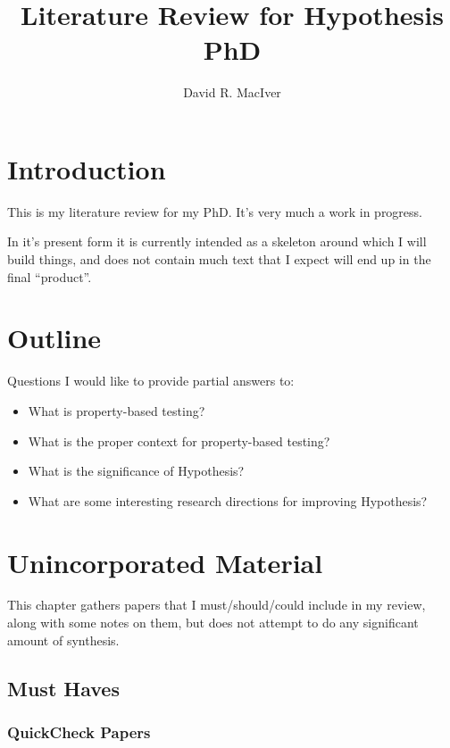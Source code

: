 

\title{Literature Review for Hypothesis PhD}
\author{David R. MacIver}



\maketitle

\tableofcontents

\chapter{Introduction}

This is my literature review for my PhD.
It's very much a work in progress.

In it's present form it is currently intended as a skeleton around which I will build things,
and does not contain much text that I expect will end up in the final ``product''.

\chapter{Outline}

Questions I would like to provide partial answers to:

\begin{itemize}
\item What is property-based testing?
\item What is the proper context for property-based testing?
\item What is the significance of Hypothesis?
\item What are some interesting research directions for improving Hypothesis?
\end{itemize}

\chapter{Unincorporated Material}

This chapter gathers papers that I must/should/could include in my review,
along with some notes on them,
but does not attempt to do any significant amount of synthesis.

\section{Must Haves}

\subsection{QuickCheck Papers}

